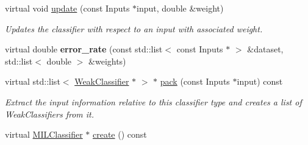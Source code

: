 \begin{DoxyCompactItemize}
virtual void \hyperlink{classiCub_1_1boostMIL_1_1MILClassifier_a8417e89679c2e9f68cd3093e2de7ba7e}{update} (const Inputs $\ast$input, double \&weight)
\begin{DoxyCompactList}\small\item\em Updates the classifier with respect to an input with associated weight. \end{DoxyCompactList}\item 
virtual double {\bfseries error\+\_\+rate} (const std\+::list$<$ const Inputs $\ast$ $>$ \&dataset, std\+::list$<$ double $>$ \&weights)\label{classiCub_1_1boostMIL_1_1MILClassifier_a5cb179f48e0ce2c9f54ea9f1bb4858da}

\item 
virtual std\+::list$<$ \hyperlink{classiCub_1_1boostMIL_1_1WeakClassifier}{Weak\+Classifier} $\ast$ $>$ $\ast$ \hyperlink{classiCub_1_1boostMIL_1_1MILClassifier_afc4a13e10568201a963701b8e983ccd7}{pack} (const Inputs $\ast$input) const 
\begin{DoxyCompactList}\small\item\em Extract the input information relative to this classifier type and creates a list of Weak\+Classifiers from it. \end{DoxyCompactList}\item 
virtual \hyperlink{classiCub_1_1boostMIL_1_1MILClassifier}{M\+I\+L\+Classifier} $\ast$ \hyperlink{classiCub_1_1boostMIL_1_1MILClassifier_aa6b3c472d5b55aac596243d30b653d0f}{create} () const \label{classiCub_1_1boostMIL_1_1MILClassifier_aa6b3c472d5b55aac596243d30b653d0f}


\end{DoxyCompactItemize}
